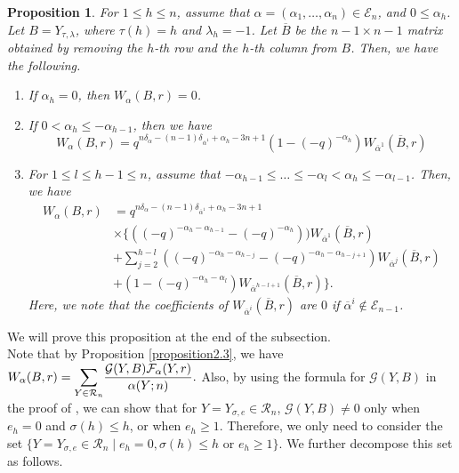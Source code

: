 \documentclass[11pt,oneside]{amsart}
\theoremstyle{plain}
\newtheorem{proposition}[theorem]{Proposition}
\theoremstyle{definition}
\theoremstyle{remark}
\newcommand{\CE}{{\mathcal E}}
\newcommand{\CF}{{\mathcal F}}
\newcommand{\CG}{{\mathcal G}}
\newcommand{\CR}{{\mathcal R}}
\numberwithin{equation}{section}
\begin{document}
	\begin{proposition}\label{proposition2.10}
		For $1 \leq h \leq n$, assume that $\alpha=(\alpha_1,\dots,\alpha_n) \in \CE_n$, and $0 \leq \alpha_h$. Let $B=Y_{\tau, \lambda}$, where $\tau(h)=h$ and $\lambda_h=-1$. Let $\overline{B}$ be the $n-1 \times n-1$ matrix obtained by removing the $h$-th row and the $h$-th column from $B$. Then, we have the following.
		
		\begin{enumerate}
			\item If $\alpha_h=0$, then $W_{\alpha}(B,r)=0$.
			
			\item If $0< \alpha_h \leq -\alpha_{h-1}$, then we have
			\begin{equation*}
				W_{\alpha}(B,r)=q^{n\delta_{\alpha}-(n-1)\delta_{\overline{\alpha}^1}+\alpha_h-3n+1}(1-(-q)^{-\alpha_h})W_{\overline{\alpha}^{1}}(\overline{B},r)
			\end{equation*}
			
			\item For $1 \leq l \leq h-1 \leq n$, assume that $-\alpha_{h-1} \leq \dots \leq -\alpha_{l}<\alpha_h \leq -\alpha_{l-1}$. Then, we have
			\begin{equation*}\begin{array}{ll}
					W_{\alpha}(B,r)&=q^{n\delta_{\alpha}-(n-1)\delta_{\overline{\alpha}^1}+\alpha_h-3n+1}
					\\&\times \lbrace ((-q)^{-\alpha_h-\alpha_{h-1}}-(-q)^{-\alpha_h}))W_{\overline{\alpha}^1}(\overline{B},r)\\
					& +\sum_{j=2}^{h-l} ((-q)^{-\alpha_h-\alpha_{h-j}}-(-q)^{-\alpha_h-\alpha_{h-j+1}})W_{\overline{\alpha}^j}(\overline{B},r)\\
					&+(1-(-q)^{-\alpha_h-\alpha_l})W_{\overline{\alpha}^{h-l+1}}(\overline{B},r)\rbrace.
				\end{array}
			\end{equation*}
			Here, we note that the coefficients of $W_{\overline{\alpha}^i}(\overline{B},r)$ are $0$ if $\overline{\alpha}^i \notin \CE_{n-1}$.
		\end{enumerate} 
		
	\end{proposition}
	
	We will prove this proposition at the end of the subsection.\\
	
	
	Note that by Proposition \ref{proposition2.3}, we have $W_{\alpha}(B,r)=\mathlarger{\sum}_{Y \in \CR_n}\dfrac{\CG(Y,B)\CF_{\alpha}(Y,r)}{\alpha(Y;n)}.$ Also, by using the formula for $\CG(Y,B)$ in the proof of \cite[Lemma 3.8]{Cho}, we can show that for $Y=Y_{\sigma,e} \in \CR_n$, $\CG(Y,B) \neq 0$ only when $e_h= 0$ and $\sigma(h) \leq h$, or when $e_h \geq 1$. Therefore, we only need to consider the set $\lbrace Y=Y_{\sigma,e}\in \CR_n \mid e_h=0, \sigma(h)\leq h \text{ or } e_h \geq 1 \rbrace$. We further decompose this set as follows.
	
\end{document}
